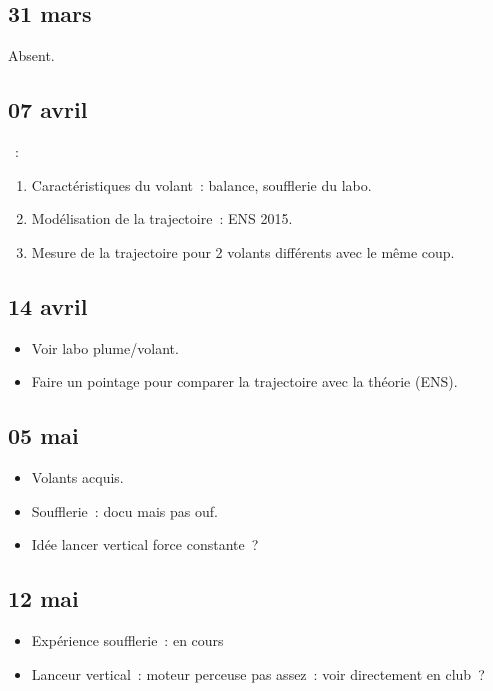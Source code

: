 \documentclass[a4paper, 11pt, final, garamond]{book}
\begin{document}
\subsection{31 mars}
\begin{center}
  Absent.
\end{center}

\subsection{07 avril}
\begin{itemize}
  ~:
    \begin{enumerate}[label=\Roman*]
      \item Caractéristiques du volant~: balance, soufflerie du labo.
      \item Modélisation de la trajectoire~: ENS 2015.
      \item Mesure de la trajectoire pour 2 volants différents avec le même
        coup.
    \end{enumerate}
\end{itemize}

\subsection{14 avril}
\begin{itemize}
  \item Voir labo plume/volant.
  \item Faire un pointage pour comparer la trajectoire avec la théorie (ENS).
\end{itemize}

\subsection{05 mai}
\begin{itemize}
  \item Volants acquis. 
  \item Soufflerie~: docu mais pas ouf.
  \item Idée lancer vertical force constante~?
\end{itemize}

\subsection{12 mai}
\begin{itemize}
  \item Expérience soufflerie~: en cours
  \item Lanceur vertical~: moteur perceuse pas assez~: voir directement en
    club~?
\end{itemize}
\end{document}
